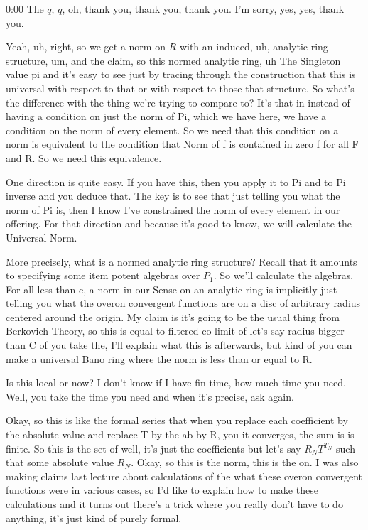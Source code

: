 \begin{unfinished}{0:00}
The $q$, $q$, oh, thank you, thank you, thank you. I'm sorry, yes, yes, thank you.

Yeah, uh, right, so we get a norm on $R$ with an induced, uh, analytic ring structure, um, and the claim, so this normed analytic ring, uh
The Singleton value pi and it's easy to see just by tracing through the construction that this is universal with respect to that or with respect to those that structure. So what's the difference with the thing we're trying to compare to? It's that in instead of having a condition on just the norm of Pi, which we have here, we have a condition on the norm of every element. So we need that this condition on a norm is equivalent to the condition that Norm of f is contained in zero f for all F and R. So we need this equivalence.

One direction is quite easy. If you have this, then you apply it to Pi and to Pi inverse and you deduce that. The key is to see that just telling you what the norm of Pi is, then I know I've constrained the norm of every element in our offering. For that direction and because it's good to know, we will calculate the Universal Norm.

More precisely, what is a normed analytic ring structure? Recall that it amounts to specifying some item potent algebras over $P_1$. So we'll calculate the algebras. For all less than c, a norm in our Sense on an analytic ring is implicitly just telling you what the overon convergent functions are on a disc of arbitrary radius centered around the origin. My claim is it's going to be the usual thing from Berkovich Theory, so this is equal to filtered co limit of let's say radius bigger than C of you take the, I'll explain what this is afterwards, but kind of you can make a universal Bano ring where the norm is less than or equal to R.

Is this local or now? I don't know if I have fin time, how much time you need. Well, you take the time you need and when it's precise, ask again.

Okay, so this is like the formal series that when you replace each coefficient by the absolute value and replace T by the ab by R, you it converges, the sum is is finite. So this is the set of well, it's just the coefficients but let's say $R_N T^{T_N}$ such that some absolute value $R_N$. Okay, so this is the norm, this is the on. I was also making claims last lecture about calculations of the what these overon convergent functions were in various cases, so I'd like to explain how to make these calculations and it turns out there's a trick where you really don't have to do anything, it's just kind of purely formal.


\end{unfinished}
